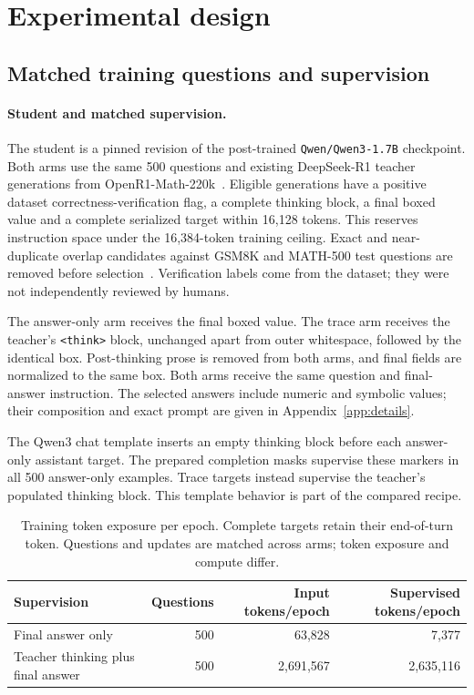 \section{Experimental design}
\label{sec:distillation}
\subsection{Matched training questions and supervision}
\paragraph{Student and matched supervision.}
The student is a pinned revision of the post-trained \texttt{Qwen/Qwen3-1.7B} checkpoint. Both arms use the same 500 questions and existing DeepSeek-R1 teacher generations from OpenR1-Math-220k~\cite{data}. Eligible generations have a positive dataset correctness-verification flag, a complete thinking block, a final boxed value and a complete serialized target within 16,128 tokens. This reserves instruction space under the 16,384-token training ceiling. Exact and near-duplicate overlap candidates against GSM8K and MATH-500 test questions are removed before selection~\cite{gsm,math}. Verification labels come from the dataset; they were not independently reviewed by humans.

The answer-only arm receives the final boxed value. The trace arm receives the teacher's \texttt{<think>} block, unchanged apart from outer whitespace, followed by the identical box. Post-thinking prose is removed from both arms, and final fields are normalized to the same box. Both arms receive the same question and final-answer instruction. The selected answers include numeric and symbolic values; their composition and exact prompt are given in Appendix~\ref{app:details}.

The Qwen3 chat template inserts an empty thinking block before each answer-only assistant target. The prepared completion masks supervise these markers in all 500 answer-only examples. Trace targets instead supervise the teacher's populated thinking block. This template behavior is part of the compared recipe.

\begin{table}[ht]
\centering\small
\begin{tabular}{lrrr}
\toprule
Supervision & Questions & Input tokens/epoch & Supervised tokens/epoch \\
\midrule
Final answer only & 500 & 63,828 & 7,377 \\
Teacher thinking plus final answer & 500 & 2,691,567 & 2,635,116 \\
\bottomrule
\end{tabular}
\caption{Training token exposure per epoch. Complete targets retain their end-of-turn token. Questions and updates are matched across arms; token exposure and compute differ.}
\label{tab:distill-exposure}
\end{table}

